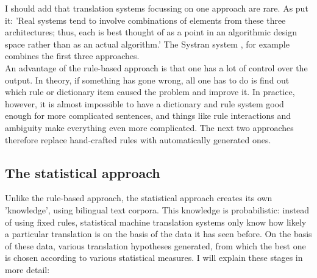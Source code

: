 \documentclass[12pt]{article}
\begin{document}
I should add that translation systems focussing on one approach are rare. As \citet{jm09} put it: 'Real systems tend to involve combinations of elements from these three architectures; thus, each is best thought of as a point in an algorithmic design space rather than as an actual algorithm.' The Systran system \citep{hs92,senellartea01}, for example combines the first three approaches.\\\indent
An advantage of the rule-based approach is that one has a lot of control over the output. In theory, if something has gone wrong, all one has to do is find out which rule or dictionary item caused the problem and improve it. In practice, however, it is almost impossible to have a dictionary and rule system good enough for more complicated sentences, and things like rule interactions and ambiguity make everything even more complicated. The next two approaches therefore replace hand-crafted rules with automatically generated ones.

\subsection{The statistical approach}

Unlike the rule-based approach, the statistical approach creates its own 'knowledge', using bilingual text corpora. This knowledge is probabilistic: instead of using fixed rules, statistical machine translation systems only know how likely a particular translation is on the basis of the data it has seen before. On the basis of these data, various translation hypotheses generated, from which the best one is chosen according to various statistical measures. I will explain these stages in more detail:
\end{document}
